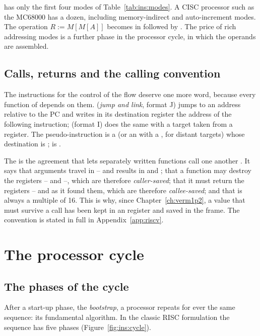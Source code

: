 \riscv has only the first four modes of Table~\ref{tab:ins:modes}. A CISC
processor such as the MC68000 has a dozen, including memory-indirect and
auto-increment modes. The operation $R:=M[M[A]]$ becomes in \riscv
{} followed by . The price of rich
addressing modes is a further phase in the processor cycle, in which the
operands are assembled.

\subsection{Calls, returns and the calling convention}

The instructions for the control of the flow deserve one more word, because
every function of \vermone depends on them.  (\emph{jump and link},
format J) jumps to an address relative to the PC and writes in its destination
register the address of the following instruction;  (format I)
does the same with a target taken from a register. The pseudo-instruction
 is a  (or an  with a , for distant
targets) whose destination is ;  is .

The  is the agreement that lets separately written
functions call one another \citep{riscvabi}. It says that arguments travel in
-- and results in  and ; that a function may
destroy the registers -- and --, which are
therefore \emph{caller-saved}; that it must return the registers
-- and  as it found them, which are therefore
\emph{callee-saved}; and that  is always a multiple of 16. This is
why, since Chapter~\ref{ch:verm1p2}, a value that must survive a call has been
kept in an  register and saved in the frame. The convention is stated
in full in Appendix~\ref{app:riscv}.

\section{The processor cycle}

\subsection{The phases of the cycle}

After a start-up phase, the \emph{bootstrap}, a processor repeats for ever the
same sequence: its fundamental algorithm. In the classic RISC formulation
the sequence has five phases (Figure~\ref{fig:ins:cycle}).

